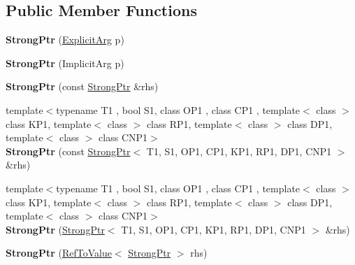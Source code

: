 \subsection*{Public Member Functions}
\begin{DoxyCompactItemize}
\item 
\hypertarget{classLoki_1_1StrongPtr_aae0e9fc9f6eac425a43157369ebcbfc8}{}{\bfseries Strong\+Ptr} (\hyperlink{structP1}{Explicit\+Arg} p)\label{classLoki_1_1StrongPtr_aae0e9fc9f6eac425a43157369ebcbfc8}

\item 
\hypertarget{classLoki_1_1StrongPtr_add9062069392d7ca5c473e2b330f225d}{}{\bfseries Strong\+Ptr} (Implicit\+Arg p)\label{classLoki_1_1StrongPtr_add9062069392d7ca5c473e2b330f225d}

\item 
\hypertarget{classLoki_1_1StrongPtr_a9a87bf6a600633a9ec9ab145e2a28c41}{}{\bfseries Strong\+Ptr} (const \hyperlink{classLoki_1_1StrongPtr}{Strong\+Ptr} \&rhs)\label{classLoki_1_1StrongPtr_a9a87bf6a600633a9ec9ab145e2a28c41}

\item 
\hypertarget{classLoki_1_1StrongPtr_a5a81ca2ffae3ce11539d733a22c34f01}{}{\footnotesize template$<$typename T1 , bool S1, class O\+P1 , class C\+P1 , template$<$ class $>$ class K\+P1, template$<$ class $>$ class R\+P1, template$<$ class $>$ class D\+P1, template$<$ class $>$ class C\+N\+P1$>$ }\\{\bfseries Strong\+Ptr} (const \hyperlink{classLoki_1_1StrongPtr}{Strong\+Ptr}$<$ T1, S1, O\+P1, C\+P1, K\+P1, R\+P1, D\+P1, C\+N\+P1 $>$ \&rhs)\label{classLoki_1_1StrongPtr_a5a81ca2ffae3ce11539d733a22c34f01}

\item 
\hypertarget{classLoki_1_1StrongPtr_a7b7a3ec06091792c21f8cbb99acefd73}{}{\footnotesize template$<$typename T1 , bool S1, class O\+P1 , class C\+P1 , template$<$ class $>$ class K\+P1, template$<$ class $>$ class R\+P1, template$<$ class $>$ class D\+P1, template$<$ class $>$ class C\+N\+P1$>$ }\\{\bfseries Strong\+Ptr} (\hyperlink{classLoki_1_1StrongPtr}{Strong\+Ptr}$<$ T1, S1, O\+P1, C\+P1, K\+P1, R\+P1, D\+P1, C\+N\+P1 $>$ \&rhs)\label{classLoki_1_1StrongPtr_a7b7a3ec06091792c21f8cbb99acefd73}

\item 
\hypertarget{classLoki_1_1StrongPtr_aecce7ed2ebdf6aa933a251b7c76db2c8}{}{\bfseries Strong\+Ptr} (\hyperlink{classLoki_1_1RefToValue}{Ref\+To\+Value}$<$ \hyperlink{classLoki_1_1StrongPtr}{Strong\+Ptr} $>$ rhs)\label{classLoki_1_1StrongPtr_aecce7ed2ebdf6aa933a251b7c76db2c8}


\end{DoxyCompactItemize}
